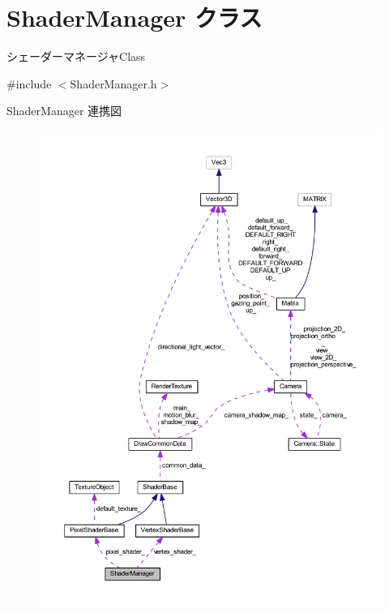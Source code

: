 \hypertarget{class_shader_manager}{}\section{Shader\+Manager クラス}
\label{class_shader_manager}


シェーダーマネージャ\+Class  




{\ttfamily \#include $<$Shader\+Manager.\+h$>$}



Shader\+Manager 連携図\nopagebreak
\begin{figure}[H]
\begin{center}
\leavevmode
\includegraphics[width=350pt]{class_shader_manager__coll__graph}
\end{center}
\end{figure}
